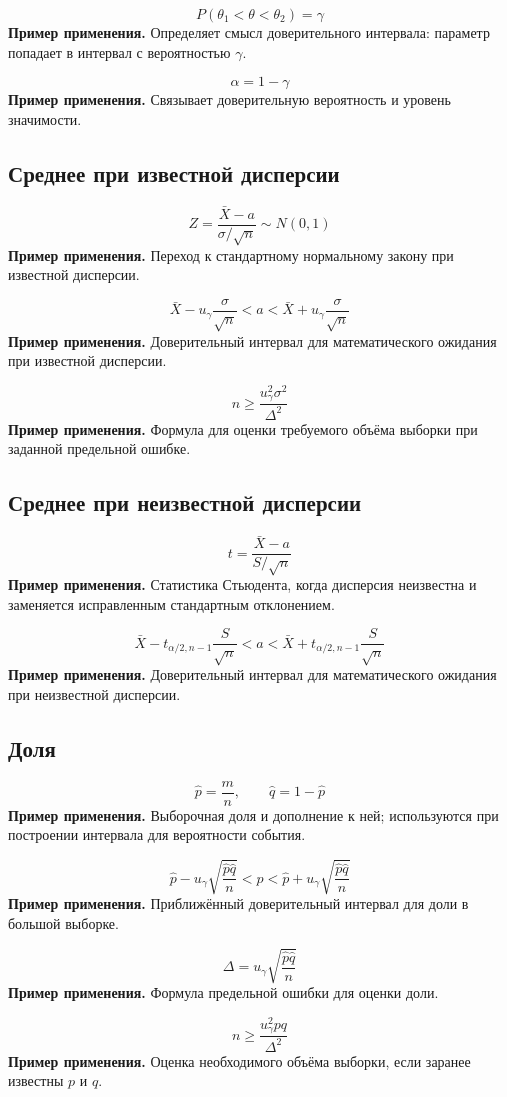 \documentclass[a4paper,14pt]{extarticle}
\newcommand{\FormulaNote}[2]{%
  \begin{equation*}
  #1
  \end{equation*}
  \noindent\textbf{Пример применения.} #2\par\medskip
}
\begin{document}
\FormulaNote{P(\theta_1<\theta<\theta_2)=\gamma}{Определяет смысл доверительного интервала: параметр попадает в интервал с вероятностью $\gamma$.}

\FormulaNote{\alpha=1-\gamma}{Связывает доверительную вероятность и уровень значимости.}

\subsection{Среднее при известной дисперсии}

\FormulaNote{Z=\frac{\bar{X}-a}{\sigma/\sqrt{n}}\sim N(0,1)}{Переход к стандартному нормальному закону при известной дисперсии.}

\FormulaNote{\bar{X}-u_\gamma\frac{\sigma}{\sqrt{n}}<a<\bar{X}+u_\gamma\frac{\sigma}{\sqrt{n}}}{Доверительный интервал для математического ожидания при известной дисперсии.}

\FormulaNote{n\ge \frac{u_\gamma^2\sigma^2}{\Delta^2}}{Формула для оценки требуемого объёма выборки при заданной предельной ошибке.}

\subsection{Среднее при неизвестной дисперсии}

\FormulaNote{t=\frac{\bar{X}-a}{S/\sqrt{n}}}{Статистика Стьюдента, когда дисперсия неизвестна и заменяется исправленным стандартным отклонением.}

\FormulaNote{\bar{X}-t_{\alpha/2,n-1}\frac{S}{\sqrt{n}}<a<\bar{X}+t_{\alpha/2,n-1}\frac{S}{\sqrt{n}}}{Доверительный интервал для математического ожидания при неизвестной дисперсии.}

\subsection{Доля}

\FormulaNote{\hat{p}=\frac{m}{n},\qquad \hat{q}=1-\hat{p}}{Выборочная доля и дополнение к ней; используются при построении интервала для вероятности события.}

\FormulaNote{\hat{p}-u_\gamma\sqrt{\frac{\hat{p}\hat{q}}{n}}<p<\hat{p}+u_\gamma\sqrt{\frac{\hat{p}\hat{q}}{n}}}{Приближённый доверительный интервал для доли в большой выборке.}

\FormulaNote{\Delta=u_\gamma\sqrt{\frac{\hat{p}\hat{q}}{n}}}{Формула предельной ошибки для оценки доли.}

\FormulaNote{n\ge \frac{u_\gamma^2pq}{\Delta^2}}{Оценка необходимого объёма выборки, если заранее известны $p$ и $q$.}
\end{document}
